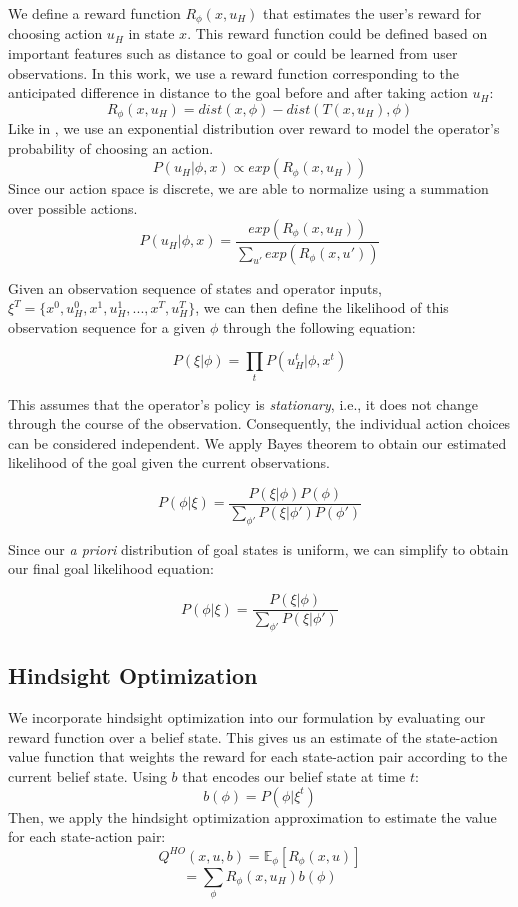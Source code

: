 \documentclass[conference]{IEEEtran}
\begin{document}
We define a reward function $R_\phi (x, u_H)$ that estimates the user's reward for choosing action $u_H$ in state $x$. This reward function could be defined based on important features such as distance to goal or could be learned from user observations. In this work, we use a reward function corresponding to the anticipated difference in distance to the goal before and after taking action $u_H$: 
\[
R_\phi (x, u_H) = dist(x, \phi) - dist(T(x, u_H), \phi)
\]
Like in \cite{ramachandran2007bayesian}, we use an exponential distribution over reward to model the operator's probability of choosing an action.
\[
P(u_H|\phi, x) \propto exp(R_\phi (x, u_H))
\]
Since our action space is discrete, we are able to normalize using a summation over possible actions.
\[
P(u_H|\phi, x) = \frac{exp(R_\phi (x, u_H))}{\sum_{u'} exp(R_\phi (x, u'))}
\]

Given an observation sequence of states and operator inputs, $\xi^T = \{x^0, u_H^0, x^1, u_H^1, ..., x^T, u_H^T\}$, we can then define the likelihood of this observation sequence for a given $\phi$ through the following equation:

\[
P(\xi|\phi) = \prod_tP(u_H^t|\phi, x^t)
\]

This assumes that the operator's policy is \textit{stationary}, i.e., it does not change through the course of the observation. Consequently, the individual action choices can be considered independent. We apply Bayes theorem to obtain our estimated likelihood of the goal given the current observations.

\[
P(\phi|\xi) = \frac{P(\xi|\phi)P(\phi)}{\sum_{\phi'}P(\xi|\phi')P(\phi')}
\]

Since our \textit{a priori} distribution of goal states is uniform, we can simplify to obtain our final goal likelihood equation:

\[
P(\phi|\xi) = \frac{P(\xi|\phi)}{\sum_{\phi'}P(\xi|\phi')}
\]

\subsection{Hindsight Optimization}

We incorporate hindsight optimization \cite{javdani2015shared} into our formulation by evaluating our reward function over a belief state. This gives us an estimate of the state-action value function that weights the reward for each state-action pair according to the current belief state. Using $b$ that encodes our belief state at time $t$:
\[
b(\phi) = P(\phi|\xi^t)
\]
Then, we apply the hindsight optimization approximation to estimate the value for each state-action pair:
\[
Q^{HO}(x,u,b) = \mathbb{E}_\phi[R_\phi (x, u)]
\]
\[
=\sum_\phi R_\phi (x, u_H)b(\phi)
\]
\end{document}
